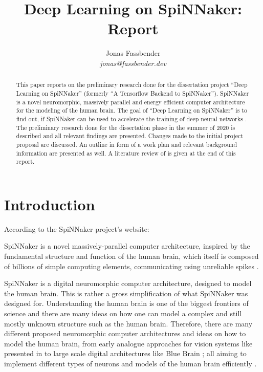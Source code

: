 \documentclass{article}
\begin{document}

\title{Deep Learning on SpiNNaker: Report}
\author{Jonas Fassbender \\ \textit{jonas@fassbender.dev}}
\date{}

\makeEPCCtitle

\newpage

\hspace{0pt}
\vfill

\begin{abstract}
This paper reports on the preliminary research done for the
dissertation project ``Deep Learning on SpiNNaker''
(formerly ``A Tensorflow Backend to SpiNNaker'').
SpiNNaker is a novel neuromorphic, massively parallel and
energy efficient computer architecture for the modeling
of the human brain.
The goal of ``Deep Learning on SpiNNaker'' is to find out,
if SpiNNaker can be used to accelerate the training of
deep neural networks \citep[see e.g.][]{goodfellow2016}.
The preliminary research done for the dissertation phase
in the summer of 2020 is described and all relevant
findings are presented.
Changes made to the initial project proposal are discussed.
An outline in form of a work plan and relevant background
information are presented as well.
A literature review of \citet{nita_2018} is given at the
end of this report.
\end{abstract}

\vfill
\hspace{0pt}

\newpage

\tableofcontents

\newpage


\section{Introduction} %
\label{sec:intro}

According to the SpiNNaker project's website:
\begin{displayquote}
  SpiNNaker is a novel massively-parallel computer
  architecture, inspired by the fundamental structure and
  function of the human brain, which itself is composed of
  billions of simple computing elements, communicating
  using unreliable spikes \citep{spinn_proj}.
\end{displayquote}

SpiNNaker is a digital neuromorphic computer architecture,
designed to model the human brain.
This is rather a gross simplification of what SpiNNaker was
designed for.
Understanding the human brain is one of the biggest
frontiers of science and there are many ideas on how one
can model a complex and still mostly unknown structure such
as the human brain.
Therefore, there are many different proposed neuromorphic
computer architectures and ideas on how to model the human
brain, from early analogue approaches for vision systems
like presented in \citet{mead1989} to large scale digital
architectures like Blue Brain \citep{markram2006}; all
aiming to implement different types of neurons and models
of the human brain efficiently \citep{furber_et_al_2007}.
\end{document}
